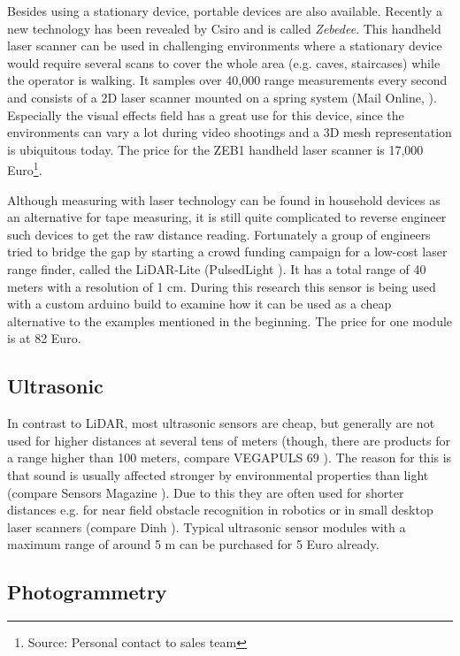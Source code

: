 Besides using a stationary device, portable devices are also available. Recently a new technology has been revealed by Csiro and is called \textit{Zebedee}. This handheld laser scanner can be used in challenging environments where a stationary device would require several scans to cover the whole area (e.g. caves, staircases) while the operator is walking. It samples over 40,000 range measurements every second and consists of a 2D laser scanner mounted on a spring system (Mail Online, \parencite{zebedee_info}). Especially the visual effects field has a great use for this device, since the environments can vary a lot during video shootings and a 3D mesh representation is ubiquitous today. The price for the ZEB1 handheld laser scanner is 17,000 Euro\footnote{Source: Personal contact to sales team}.

Although measuring with laser technology can be found in household devices as an alternative for tape measuring, it is still quite complicated to reverse engineer such devices to get the raw distance reading. Fortunately a group of engineers tried to bridge the gap by starting a crowd funding campaign for a low-cost laser range finder, called the LiDAR-Lite (PulsedLight \parencite{pulsedlight}). It has a total range of 40 meters with a resolution of 1 cm. During this research this sensor is being used with a custom arduino build to examine how it can be used as a cheap alternative to the examples mentioned in the beginning. The price for one module is at 82 Euro.

\subsection{Ultrasonic}

In contrast to LiDAR, most ultrasonic sensors are cheap, but generally are not used for higher distances at several tens of meters (though, there are products for a range higher than 100 meters, compare VEGAPULS 69 \parencite{vegapuls}). The reason for this is that sound is usually affected stronger by environmental properties than light (compare Sensors Magazine \parencite{sensorsmag}). Due to this they are often used for shorter distances e.g. for near field obstacle recognition in robotics or in small desktop laser scanners (compare Dinh \parencite{yt_smalldesktoplaser}). Typical ultrasonic sensor modules with a maximum range of around 5 m can be purchased for 5 Euro already.



\subsection{Photogrammetry}


